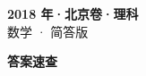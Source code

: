 \documentclass[zihao=-4, a4paper]{ctexart}
\begin{document}
\begin{center}
  {\Large\bfseries 2018 年·北京卷·理科}\\[4pt]
  {\large 数学 · 简答版}
\end{center}
\medskip
{}

\clearpage
{}
\begin{center}{\Large\bfseries 答案速查}\end{center}
\medskip

\end{document}
